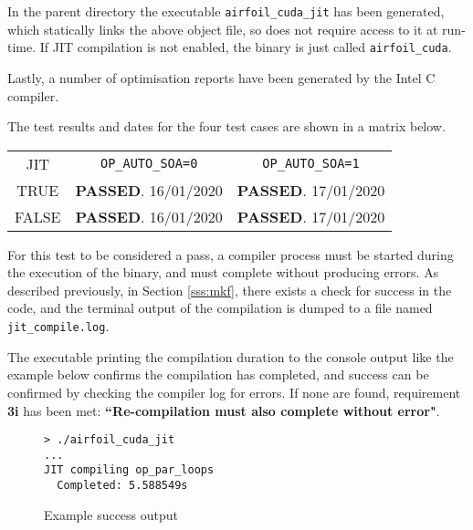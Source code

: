 \par  In the parent directory the executable \verb|airfoil_cuda_jit| has been generated, which statically links the above object file, so does not require access to it at run-time. If JIT compilation is not enabled, the binary is just called \verb|airfoil_cuda|.\par Lastly, a number of optimisation reports have been generated by the Intel C compiler.\par
\vspace{3cm}
\noindent The test results and dates for the four test cases are shown in a matrix below.
\begin{table}[h]
\centering
\renewcommand{\arraystretch}{1.5}
\begin{tabular}{| c || c | c |}
\hline
JIT & \verb|OP_AUTO_SOA=0| & \verb|OP_AUTO_SOA=1| \\
\hhline{|=|=|=|}
TRUE &\textbf{\textcolor{green!20!black}{PASSED}}. 16/01/2020 &\textbf{\textcolor{green!20!black}{PASSED}}. 17/01/2020 \\
\hline
FALSE&\textbf{\textcolor{green!20!black}{PASSED}}. 16/01/2020 &\textbf{\textcolor{green!20!black}{PASSED}}. 17/01/2020 \\
\hline
\end{tabular}
\end{table}

\label{sss:jit_comp}
For this test to be considered a pass, a compiler process must be started during the execution of the binary, and must complete without producing errors. As described previously, in Section \ref{sss:mkf}, there exists a check for success in the code, and the terminal output of the compilation is dumped to a file named \verb|jit_compile.log|.
\par
The executable printing the compilation duration to the console output like the example below confirms the compilation has completed, and success can be confirmed by checking the compiler log for errors. If none are found, requirement \textbf{3i} has been met: \textbf{``Re-compilation must also complete without error"}.

\begin{figure}[h!]
  \caption{\label{fig:jit_ex}Example success output}
\begin{verbatim}
> ./airfoil_cuda_jit
...
JIT compiling op_par_loops
  Completed: 5.588549s
\end{verbatim}
\end{figure}

